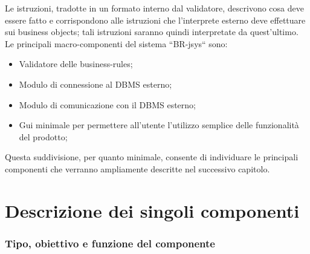 \documentclass[11pt,titlepage,a4paper]{report}
\begin{document}
Le istruzioni, tradotte in un formato interno dal validatore, descrivono cosa deve essere fatto e corrispondono alle istruzioni che l'interprete esterno deve effettuare sui business objects; tali istruzioni saranno quindi interpretate da quest'ultimo.
Le principali macro-componenti del sistema ``BR-jsys`` sono:
\begin{itemize}
\item Validatore delle business-rules;
\item Modulo di connessione al DBMS esterno;
\item Modulo di comunicazione con il DBMS esterno;
\item Gui minimale per permettere all'utente l'utilizzo semplice delle funzionalit\`a del prodotto;
\end{itemize}

Questa suddivisione, per quanto minimale, consente di individuare le principali componenti che verranno ampliamente descritte nel successivo capitolo.

\chapter{Descrizione dei singoli componenti}
\subsection{Tipo, obiettivo e funzione del componente}
\end{document}
